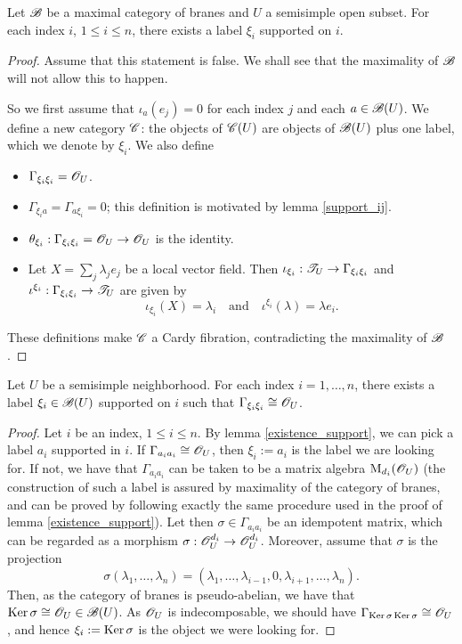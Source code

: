 \begin{lemma}\label{existence_support}
Let $\mathscr{B}$ be a maximal category of branes and $U$ a semisimple open subset. For each index $i$, $1\leqslant i\leqslant n$, there exists a label $\xi_i$ supported on $i$.
\end{lemma}
\begin{proof}
Assume that this statement is false. We shall see that the maximality of $\mathscr{B}$ will not allow this to happen.

So we first assume that $\iota_a(e_j)=0$ for each index $j$ and each $a\in \mathscr{B}(U)$. We define a new category $\mathscr{C}$: the objects of $\mathscr{C}(U)$ are objects of $\mathscr{B}(U)$ plus one label, which we denote by $\xi_i$. We also define
\begin{itemize}
\item $\Gamma_{\xi_i\xi_i}=\mathscr{O}_U$.
\item $\Gamma_{\xi_ia}=\Gamma_{a\xi_i}=0$; this definition is motivated by lemma \ref{support_ij}.
\item $\theta_{\xi_i}:\Gamma_{\xi_i\xi_i}=\mathscr{O}_U \to \mathscr{O}_U$ is the identity.
\item Let $X=\sum_j\lambda_je_j$ be a local vector field. Then $\iota_{\xi_i}:\mathscr{T}_U\to \Gamma_{\xi_i\xi_i}$ and $\iota^{\xi_i}:\Gamma_{\xi_i\xi_i}\to \mathscr{T}_U$ are given by
$$\iota_{\xi_i}(X)=\lambda_i \quad \text{and} \quad \iota^{\xi_i}(\lambda )=\lambda e_i.$$
\end{itemize}
These definitions make $\mathscr{C}$ a Cardy fibration, contradicting the maximality of $\mathscr{B}$.
\end{proof}

\begin{proposition}\label{invertibles}
Let $U$ be a semisimple neighborhood. For each index $i=1,\dots ,n$, there exists a label $\xi_i\in \mathscr{B}(U)$ supported on $i$ such that $\Gamma_{\xi_i\xi_i}\cong \mathscr{O}_U$.
\end{proposition}
\begin{proof}
Let $i$ be an index, $1\leqslant i\leqslant n$. By lemma \ref{existence_support}, we can pick a label $a_i$ supported in $i$. If $\Gamma_{a_ia_i}\cong \mathscr{O}_U$, then $\xi_i:=a_i$ is the label we are looking for. If not, we have that $\Gamma_{a_ia_i}$ can be taken to be a matrix algebra $\operatorname{M}_{d_i}(\mathscr{O}_U)$ (the construction of such a label is assured by maximality of the category of branes, and can be proved by following exactly the same procedure used in the proof of lemma \ref{existence_support}). Let then $\sigma \in \Gamma_{a_ia_i}$ be an idempotent matrix, which can be regarded as a morphism $\sigma :\mathscr{O}_U^{d_i}\to \mathscr{O}_U^{d_i}$. Moreover, assume that $\sigma$ is the projection
$$\sigma (\lambda_1,\dots ,\lambda_n)=(\lambda_1,\dots ,\lambda_{i-1},0,\lambda_{i+1},\dots ,\lambda_n).$$
Then, as the category of branes is pseudo-abelian, we have that $\operatorname{Ker}\sigma \cong \mathscr{O}_U\in \mathscr{B}(U)$. As $\mathscr{O}_U$ is indecomposable, we should have $\Gamma_{\operatorname{Ker}\sigma\operatorname{Ker}\sigma}\cong \mathscr{O}_U$, and hence $\xi_i:=\operatorname{Ker}\sigma$ is the object we were looking for.
\end{proof}

